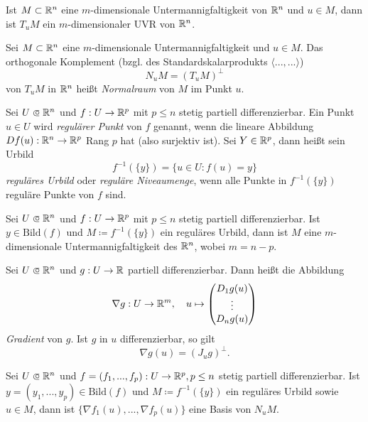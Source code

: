 \documentclass{cheat-sheet}
\begin{document}
\begin{satz}
Ist $M \subset \mathbb{R}^n$ eine $m$-dimensionale Untermannigfaltigkeit von $\mathbb{R}^n$ und $u \in M$, dann ist $T_u M$ ein $m$-dimensionaler UVR von $\mathbb{R}^n$.
\end{satz}

\begin{defn}
Sei $M \subset \mathbb{R}^n$ eine $m$-dimensionale Untermannigfaltigkeit und $u \in M$. Das orthogonale Komplement (bzgl. des Standardskalarprodukts $\langle ..., ... \rangle$)
\[ N_u M = (T_u M)^\perp \]
von $T_u M$ in $\mathbb{R}^n$ heißt \emph{Normalraum} von $M$ im Punkt $u$.
\end{defn}

\begin{defn}
Sei $U \opn \R^n$ und $f : U \to \mathbb{R}^p$ mit $p \le n$ stetig partiell differenzierbar. Ein Punkt $u \in U$ wird \emph{regulärer Punkt} von $f$ genannt, wenn die lineare Abbildung $D f(u) : \mathbb{R}^n \to \mathbb{R}^p$ Rang $p$ hat (also surjektiv ist). Sei $Y \in \mathbb{R}^p$, dann heißt sein Urbild
\[ f^{-1}(\{y\}) = \{ u \in U : f(u) = y \} \]
\emph{reguläres Urbild} oder \emph{reguläre Niveaumenge}, wenn alle Punkte in $f^{-1}(\{ y \})$ reguläre Punkte von $f$ sind.
\end{defn}

\begin{defn}
Sei $U \opn \R^n$ und $f : U \to \mathbb{R}^p$ mit $p \le n$ stetig partiell differenzierbar. Ist $y \in \mathrm{Bild}(f)$ und $M \coloneqq f^{-1}(\{ y \})$ ein reguläres Urbild, dann ist $M$ eine $m$-dimensionale Untermannigfaltigkeit des $\mathbb{R}^n$, wobei $m = n - p$.
\end{defn}

\begin{defn}
Sei $U \opn \R^n$ und $g : U \to \mathbb{R}$ partiell differenzierbar. Dann heißt die Abbildung
\[ \nabla g : U \to \mathbb{R}^m,\quad u \mapsto \begin{pmatrix} D_1 g(u) \\ \vdots \\ D_n g(u) \end{pmatrix} \]
\emph{Gradient} von $g$. Ist $g$ in $u$ differenzierbar, so gilt
\[ \nabla g(u) = (J_u g)^\perp. \]
\end{defn}

\begin{satz}
Sei $U \opn \R^n$ und $f = (f_1, ..., f_p) : U \to \mathbb{R}^p, p \le n$ stetig partiell differenzierbar. Ist $y = (y_1, ..., y_p) \in \mathrm{Bild}(f)$ und $M \coloneqq f^{-1}(\{ y \})$ ein reguläres Urbild sowie $u \in M$, dann ist $\{ \nabla f_1(u), ..., \nabla f_p(u) \}$ eine Basis von $N_u M$.
\end{satz}
\end{document}

